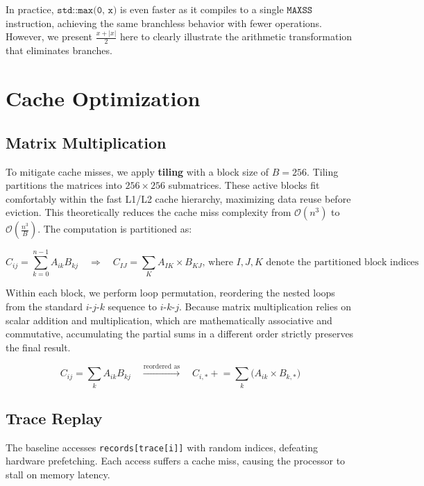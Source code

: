 \documentclass[11pt]{article}
\begin{document}
\vspace{0.3em}

\noindent In practice, $\texttt{std::max(0, x)}$ is even faster as it compiles to a single $\texttt{MAXSS}$ instruction, achieving the same branchless behavior with fewer operations. However, we present $\frac{x + |x|}{2}$ here to clearly illustrate the arithmetic transformation that eliminates branches.

\section{Cache Optimization}
\subsection{Matrix Multiplication}

To mitigate cache misses, we apply \textbf{tiling} with a block size of $B = 256$. Tiling partitions the matrices into $256 \times 256$ submatrices. These active blocks fit comfortably within the fast L1/L2 cache hierarchy, maximizing data reuse before eviction. This theoretically reduces the cache miss complexity from $\mathcal{O}(n^3)$ to $\mathcal{O}\left(\frac{n^3}{B}\right)$. The computation is partitioned as:

\[
C_{ij} = \sum_{k=0}^{n-1} A_{ik} B_{kj} \quad \Rightarrow \quad
C_{IJ} = \sum_{K} A_{IK} \times B_{KJ}\text{, where $I, J, K$ denote the partitioned block indices}
\]

\noindent Within each block, we perform loop permutation, reordering the nested loops from the standard $i$-$j$-$k$ sequence to $i$-$k$-$j$. Because matrix multiplication relies on scalar addition and multiplication, which are mathematically associative and commutative, accumulating the partial sums in a different order strictly preserves the final result. 

\[
C_{ij} = \sum_{k} A_{ik} B_{kj} \quad \xrightarrow{\text{reordered as}} \quad C_{i, *} \mathrel{+}= \sum_{k} \Big( A_{ik} \times B_{k, *} \Big)
\]

\subsection{Trace Replay}

The baseline accesses \texttt{records[trace[i]]} with random indices, defeating hardware prefetching. Each access suffers a cache miss, causing the processor to stall on memory latency.

\vspace {0.3em}
\end{document}
